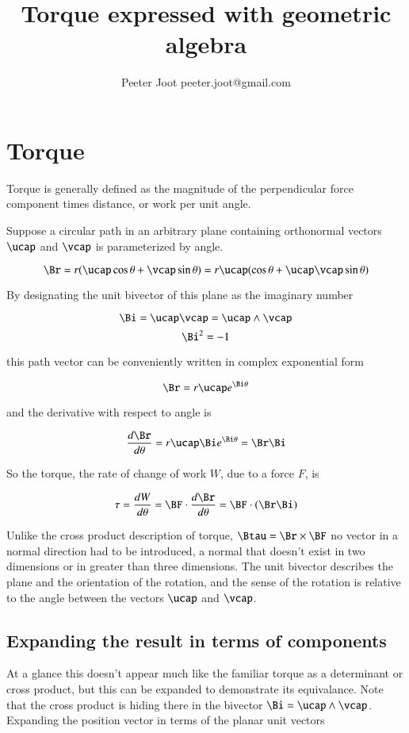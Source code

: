 \documentclass{article}      %
\title{Torque expressed with geometric algebra} %
\author{Peeter Joot \quad peeter.joot@gmail.com}         %
\newcommand{\dtheta}[1]{\frac{d {#1}}{d \theta}}
\begin{document}

\maketitle{}

\section{Torque}

Torque is generally defined as the magnitude of the perpendicular force component times distance, or work per unit angle.

Suppose a circular path in an arbitrary plane containing orthonormal vectors $\ucap$ and $\vcap$ is parameterized by angle.

\[
\Br = r(\ucap \cos \theta + \vcap \sin \theta) = r \ucap(\cos \theta + \ucap \vcap \sin \theta)
\]

By designating the unit bivector of this plane as the imaginary number

\[
\Bi  = \ucap \vcap = \ucap \wedge \vcap
\]
\[
\Bi ^2 = -1
\]

this path vector can be conveniently written in complex exponential form

\[
\Br = r \ucap e^{\Bi \theta}
\]

and the derivative with respect to angle is

\[
\dtheta{\Br} = r \ucap \Bi  e^{\Bi  \theta} = \Br  \Bi 
\]

So the torque, the rate of change of work $W$, due to a force $F$, is

\[
\tau = \dtheta{W} = \BF \cdot \dtheta{\Br} = \BF \cdot (\Br  \Bi )
\]

Unlike the cross product description of torque, $\Btau = \Br \times \BF$ no vector in a normal direction had to be introduced, a normal that doesn't exist in two dimensions or in greater than three dimensions.  The unit bivector describes the plane and the orientation of the rotation, and the sense of the rotation is relative to the angle between the vectors $\ucap$ and $\vcap$.

\subsection{Expanding the result in terms of components }

At a glance this doesn't appear much like the familiar torque as a determinant or cross product, but this can be expanded to demonstrate its equivalance.  Note that the cross product is hiding there in the bivector $\Bi = \ucap \wedge \vcap$.  Expanding the position vector in terms of the planar unit vectors 
\end{document}
